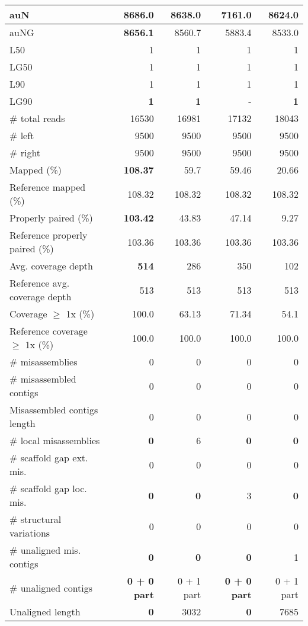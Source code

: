 \documentclass[12pt,a4paper]{article}
\begin{document}
\begin{table}[ht]
\begin{center}
\begin{tabular}{|l*{4}{|r}|}
auN & {\bf 8686.0} & 8638.0 & 7161.0 & 8624.0 \\ \hline
auNG & {\bf 8656.1} & 8560.7 & 5883.4 & 8533.0 \\ \hline
L50 & 1 & 1 & 1 & 1 \\ \hline
LG50 & 1 & 1 & 1 & 1 \\ \hline
L90 & 1 & 1 & 1 & 1 \\ \hline
LG90 & {\bf 1} & {\bf 1} & - & {\bf 1} \\ \hline
\# total reads & 16530 & 16981 & 17132 & 18043 \\ \hline
\# left & 9500 & 9500 & 9500 & 9500 \\ \hline
\# right & 9500 & 9500 & 9500 & 9500 \\ \hline
Mapped (\%) & {\bf 108.37} & 59.7 & 59.46 & 20.66 \\ \hline
Reference mapped (\%) & 108.32 & 108.32 & 108.32 & 108.32 \\ \hline
Properly paired (\%) & {\bf 103.42} & 43.83 & 47.14 & 9.27 \\ \hline
Reference properly paired (\%) & 103.36 & 103.36 & 103.36 & 103.36 \\ \hline
Avg. coverage depth & {\bf 514} & 286 & 350 & 102 \\ \hline
Reference avg. coverage depth & 513 & 513 & 513 & 513 \\ \hline
Coverage $\geq$ 1x (\%) & 100.0 & 63.13 & 71.34 & 54.1 \\ \hline
Reference coverage $\geq$ 1x (\%) & 100.0 & 100.0 & 100.0 & 100.0 \\ \hline
\# misassemblies & 0 & 0 & 0 & 0 \\ \hline
\# misassembled contigs & 0 & 0 & 0 & 0 \\ \hline
Misassembled contigs length & 0 & 0 & 0 & 0 \\ \hline
\# local misassemblies & {\bf 0} & 6 & {\bf 0} & {\bf 0} \\ \hline
\# scaffold gap ext. mis. & 0 & 0 & 0 & 0 \\ \hline
\# scaffold gap loc. mis. & {\bf 0} & {\bf 0} & 3 & {\bf 0} \\ \hline
\# structural variations & 0 & 0 & 0 & 0 \\ \hline
\# unaligned mis. contigs & {\bf 0} & {\bf 0} & {\bf 0} & 1 \\ \hline
\# unaligned contigs & {\bf 0 + 0 part} & 0 + 1 part & {\bf 0 + 0 part} & 0 + 1 part \\ \hline
Unaligned length & {\bf 0} & 3032 & {\bf 0} & 7685 \\ \hline

\end{tabular}
\end{center}
\end{table}
\end{document}

